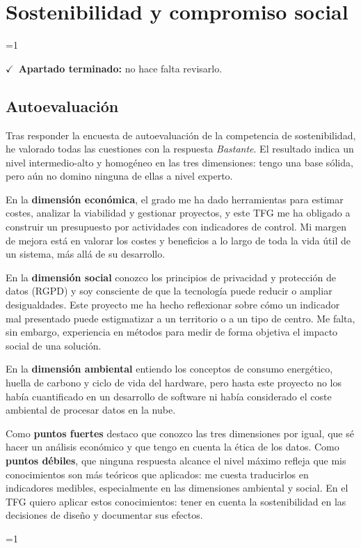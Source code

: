 \documentclass[12pt, a4paper, oneside]{report}
\newcommand{\mostrarterminados}{1}
\newenvironment{revisado}
  {\ifnum\mostrarterminados=1\relax\begin{cajarevisada}\noindent\colorbox{verdeterminado}{\parbox{\dimexpr\linewidth-2\fboxsep\relax}{\small$\checkmark$\ \textbf{Apartado terminado:} no hace falta revisarlo.}}\par\medskip\fi}
  {\ifnum\mostrarterminados=1\relax\end{cajarevisada}\fi}
\begin{document}
\chapter{Sostenibilidad y compromiso social}
\begin{revisado}

\section{Autoevaluación}
Tras responder la encuesta de autoevaluación de la competencia de sostenibilidad, he valorado todas las cuestiones con la respuesta \textit{\guillemotleft{}Bastante\guillemotright{}}. El resultado indica un nivel intermedio-alto y homogéneo en las tres dimensiones: tengo una base sólida, pero aún no domino ninguna de ellas a nivel experto.

En la \textbf{dimensión económica}, el grado me ha dado herramientas para estimar costes, analizar la viabilidad y gestionar proyectos, y este TFG me ha obligado a construir un presupuesto por actividades con indicadores de control. Mi margen de mejora está en valorar los costes y beneficios a lo largo de toda la vida útil de un sistema, más allá de su desarrollo.

En la \textbf{dimensión social} conozco los principios de privacidad y protección de datos (RGPD) y soy consciente de que la tecnología puede reducir o ampliar desigualdades. Este proyecto me ha hecho reflexionar sobre cómo un indicador mal presentado puede estigmatizar a un territorio o a un tipo de centro. Me falta, sin embargo, experiencia en métodos para medir de forma objetiva el impacto social de una solución.

En la \textbf{dimensión ambiental} entiendo los conceptos de consumo energético, huella de carbono y ciclo de vida del hardware, pero hasta este proyecto no los había cuantificado en un desarrollo de software ni había considerado el coste ambiental de procesar datos en la nube.

Como \textbf{puntos fuertes} destaco que conozco las tres dimensiones por igual, que sé hacer un análisis económico y que tengo en cuenta la ética de los datos. Como \textbf{puntos débiles}, que ninguna respuesta alcance el nivel máximo refleja que mis conocimientos son más teóricos que aplicados: me cuesta traducirlos en indicadores medibles, especialmente en las dimensiones ambiental y social. En el TFG quiero aplicar estos conocimientos: tener en cuenta la sostenibilidad en las decisiones de diseño y documentar sus efectos.


\end{revisado}
\end{document}
